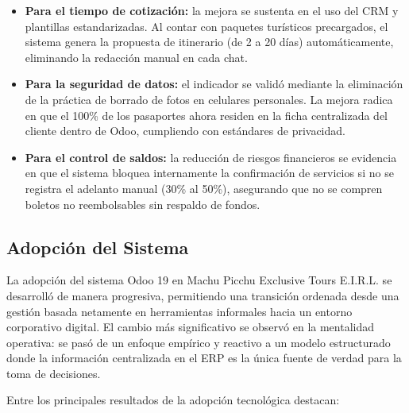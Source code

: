 \begin{itemize}
    \item \textbf{Para el tiempo de cotización:} la mejora se sustenta en el uso del CRM y plantillas estandarizadas. Al contar con paquetes turísticos precargados, el sistema genera la propuesta de itinerario (de 2 a 20 días) automáticamente, eliminando la redacción manual en cada chat.
    \item \textbf{Para la seguridad de datos:} el indicador se validó mediante la eliminación de la práctica de borrado de fotos en celulares personales. La mejora radica en que el 100\% de los pasaportes ahora residen en la ficha centralizada del cliente dentro de Odoo, cumpliendo con estándares de privacidad.
    \item \textbf{Para el control de saldos:} la reducción de riesgos financieros se evidencia en que el sistema bloquea internamente la confirmación de servicios si no se registra el adelanto manual (30\% al 50\%), asegurando que no se compren boletos no reembolsables sin respaldo de fondos.
\end{itemize}

\subsection{Adopción del Sistema}

La adopción del sistema Odoo 19 en Machu Picchu Exclusive Tours E.I.R.L. se desarrolló de
manera progresiva, permitiendo una transición ordenada desde una gestión basada netamente en
herramientas informales hacia un entorno corporativo digital. El cambio más significativo se
observó en la mentalidad operativa: se pasó de un enfoque empírico y reactivo a un modelo
estructurado donde la información centralizada en el ERP es la única fuente de verdad para la
toma de decisiones.

Entre los principales resultados de la adopción tecnológica destacan:


